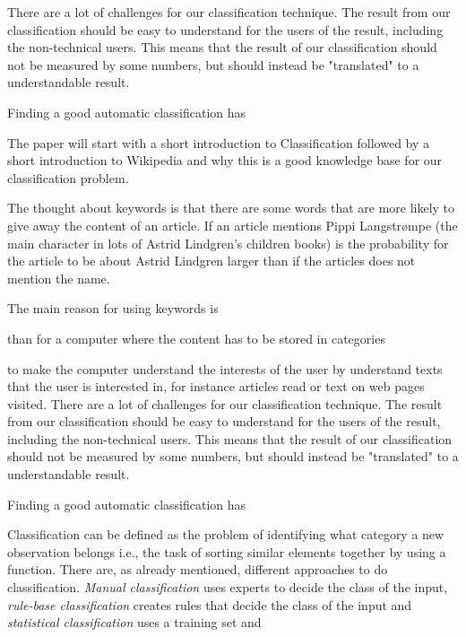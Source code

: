 There are a lot of challenges for our classification technique. The result from our classification should be easy to understand for the users of the result, including the non-technical users. This means that the result of our classification should not be measured by some numbers, but should instead be "translated" to a understandable result. 



Finding a good automatic classification has


The paper will start with a short introduction to Classification followed by a short introduction to Wikipedia and why this is a good knowledge base for our classification problem. 


The thought about keywords is that there are some words that are more likely to give away the content of an article. If an article mentions Pippi Langstrømpe (the main character in lots of Astrid Lindgren's children books) is the probability for the article to be about Astrid Lindgren larger than if the articles does not mention the name. 

The main reason for using keywords is


than for a computer where the content has to be stored in categories



to make the computer understand the interests of the user by understand texts that the user is interested in, for instance articles read or text on web pages visited. 
There are a lot of challenges for our classification technique. The result from our classification should be easy to understand for the users of the result, including the non-technical users. This means that the result of our classification should not be measured by some numbers, but should instead be "translated" to a understandable result. 



Finding a good automatic classification has

Classification can be defined as the problem of identifying what category a new observation belongs %
i.e., the task of sorting similar elements together by using a function. There are, as already mentioned, different approaches to do classification. \textit{Manual classification} uses experts to decide the class of the input, \textit{rule-base classification} creates rules that decide the class of the input and \textit{statistical classification} uses a training set and 

